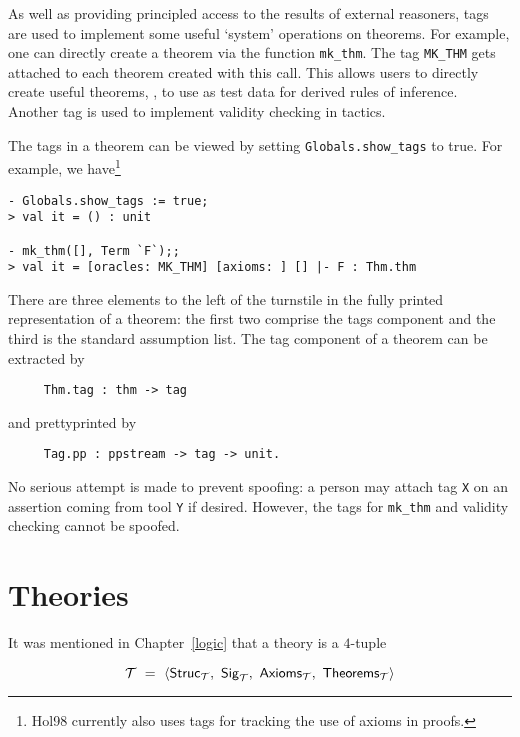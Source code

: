As well as providing principled access to the results of external
reasoners, tags are used to implement some useful `system' operations on
theorems. For example, one can directly create a theorem via the function
\verb+mk_thm+. The tag \verb+MK_THM+ gets attached to each theorem
created with this call. This allows users to directly create useful
theorems, \eg, to use as test data for derived rules of inference.
Another tag is used to implement validity checking in tactics.

The tags in a theorem can be viewed by setting \verb+Globals.show_tags+ to
true. For example, we have\footnote{Hol98 currently also uses tags for
tracking the use of axioms in proofs.}
\setcounter{sessioncount}{1}
\begin{session}\begin{verbatim}
- Globals.show_tags := true;
> val it = () : unit

- mk_thm([], Term `F`);;
> val it = [oracles: MK_THM] [axioms: ] [] |- F : Thm.thm
\end{verbatim}\end{session}

There are three elements to the left of the turnstile in the fully printed
representation of a theorem: the first two comprise the tags component and the
third is the standard assumption list. The tag component of a theorem
can be extracted by
 \begin{verbatim}
     Thm.tag : thm -> tag
 \end{verbatim}
\noindent and prettyprinted by
 \begin{verbatim}
     Tag.pp : ppstream -> tag -> unit.
 \end{verbatim}


No serious attempt is made to prevent spoofing: a person may attach tag
\verb+X+ on an assertion coming from tool \verb+Y+ if desired. However, the
tags for \verb+mk_thm+ and validity checking cannot be spoofed.


\section{Theories}
\label{theoryfns}

It was mentioned in Chapter~\ref{logic} that a theory is a $4$-tuple

\[ {\cal T}\ =\ \langle{\sf Struc}_{\cal T},\
                {\sf Sig}_{\cal T},\
                {\sf Axioms}_{\cal T},\
                {\sf Theorems}_{\cal T}\rangle \]

